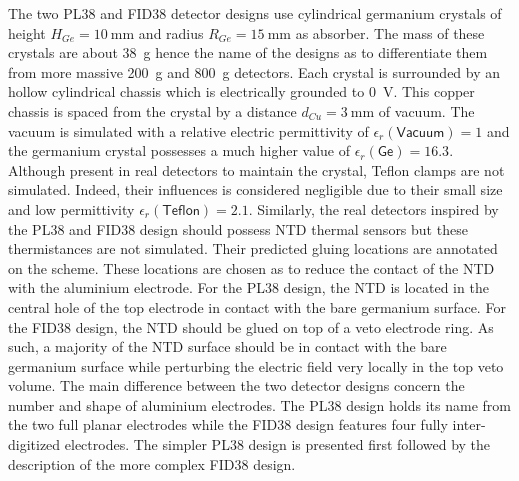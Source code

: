 The two PL38 and FID38 detector designs use cylindrical germanium crystals of height $H_{Ge} = \SI{10}{\mm}$ and radius $R_{Ge} = \SI{15}{\mm}$ as absorber. The mass of these crystals are about \SI{38}{\g} hence the name of the designs as to differentiate them from more massive \SI{200}{\g} and \SI{800}{\g} \Edelweiss{} detectors. Each crystal is surrounded by an hollow cylindrical chassis which is electrically grounded to \SI{0}{\volt}. This copper chassis is spaced from the crystal by a distance $d_{Cu} = \SI{3}{\mm}$ of vacuum.
The vacuum is simulated with a relative electric permittivity of $\epsilon_r(\textsf{Vacuum}) = 1$ and the germanium crystal possesses a much higher value of $\epsilon_r (\textsf{Ge}) = 16.3$. Although present in real detectors to maintain the crystal, Teflon clamps are not simulated. Indeed, their influences is considered negligible due to their small size and low permittivity $\epsilon_r(\textsf{Teflon})=2.1$.
Similarly, the real detectors inspired by the PL38 and FID38 design should possess NTD thermal sensors but these thermistances are not simulated. Their predicted gluing locations are annotated on the scheme. These locations are chosen as to reduce the contact of the NTD with the aluminium electrode. For the PL38 design, the NTD is located in the central hole of the top electrode in contact with the bare germanium surface. For the FID38 design, the NTD should be glued on top of a veto electrode ring. As such, a majority of the NTD surface should be in contact with the bare germanium surface while perturbing the electric field very locally in the top veto volume.
The main difference between the two detector designs concern the number and shape of aluminium electrodes. The PL38 design holds its name from the two full planar electrodes while the FID38 design features four fully inter-digitized electrodes. The simpler PL38 design is presented first followed by the description of the more complex FID38 design.


